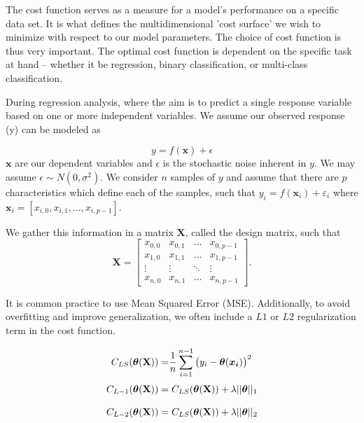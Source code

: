 \documentclass{article}
\theoremstyle{definition}
\begin{document}
The cost function serves as a measure for a model's performance on a specific data set. It is what defines the multidimensional 'cost surface' we wish to minimize with respect to our model parameters. The choice of cost function is thus very important. The optimal cost function is dependent on the specific task at hand – whether it be regression, binary classification, or multi-class classification.

During regression analysis, where the aim is to predict a single response variable based on one or more independent variables. We assume our observed response (y) can be modeled as

\begin{equation*}
    y = f(\mathbf{x}) + \epsilon
\end{equation*}
$\mathbf{x}$ are our dependent variables and $\epsilon$ is 
the stochastic noise inherent in $y$. We may assume $\epsilon \sim N(0,\sigma^2)$.
We consider $n$ samples of $y$ and assume that there are $p$ characteristics which define each of the samples, such that $y_i = f(\boldsymbol{x}_i) + \varepsilon_i$ where $\boldsymbol{x}_i = \left[x_{i,0}, x_{i, 1}, \ldots, x_{i, p-1} \right]$.

We gather this information in a matrix $\textbf{X}$, called the design matrix, such that
\begin{equation*}
    \textbf{X} =
    \begin{bmatrix}
        x_{0,0} & x_{0,1} & \ldots & x_{0, p-1} \\
        x_{1,0} & x_{1,1} & \ldots & x_{1, p-1} \\
        \vdots & \vdots & \ddots & \vdots \\
        x_{n,0} & x_{n,1} & \ldots & x_{n, p-1}
    \end{bmatrix}.
\end{equation*}


It is common practice to use Mean Squared Error (MSE). Additionally, to avoid overfitting and improve generalization, we often include a $L1$ or $L2$ regularization term in the cost function. 

\begin{align*}
C_{LS} (\boldsymbol{\theta}(\mathbf{X})) =& \frac{1}{n} \sum_{i=1}^{n-1}\left(y_i - \boldsymbol{\theta}(\boldsymbol{x_i})\right)^2\\[1mm]
C_{L-1} (\boldsymbol{\theta}(\mathbf{X}))= & \hspace{1mm} C_{LS}(\boldsymbol{\theta}(\mathbf{X})) + \lambda ||\boldsymbol{\theta}||_1\\[3mm]
C_{L-2} (\boldsymbol{\theta}(\mathbf{X}))= & \hspace{1mm} C_{LS}(\boldsymbol{\theta}(\mathbf{X})) + \lambda  ||\boldsymbol{\theta}||_2
\end{align*}
\end{document}
